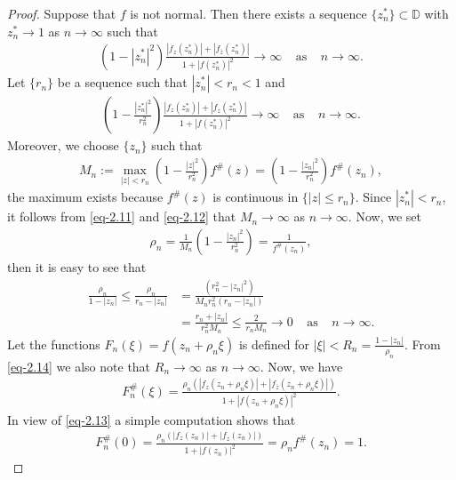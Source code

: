 \documentclass[a4paper,12pt]{amsart}
\theoremstyle{plain}
\theoremstyle{definition}
\begin{document}
\begin{proof}
Suppose that $f$ is not normal. Then there exists a sequence $\{z^*_n\}\subset\mathbb{D}$ with $z^*_n\rightarrow 1$ as $n\rightarrow\infty$ such that 
\begin{align*}
	\left(1-|z^*_n|^2\right)\frac{|f_z(z^*_n)|+|f_{\overline{z}}(z^*_n)|}{1+|f(z^*_n)|^2}\rightarrow\infty \;\;\;\; \mbox{as}\;\;\;\;n\rightarrow\infty.
\end{align*}
Let $\{r_n\}$ be a sequence such that $|z^*_n|<r_n<1$ and
\begin{align}\label{eq-2.11}
	\left(1-\frac{|z^*_n|^2}{r^2_n}\right)\frac{|f_z(z^*_n)|+|f_{\overline{z}}(z^*_n)|}{1+|f(z^*_n)|^2}\rightarrow\infty \;\;\;\; \mbox{as}\;\;\;\;n\rightarrow\infty.
\end{align}
Moreover, we choose $\{z_n\}$ such that
\begin{align}\label{eq-2.12}
	M_n:=\max_{|z|<r_n}\left(1-\frac{|z|^2}{r^2_n}\right)f^{\#}(z) =\left(1-\frac{|z_n|^2}{r^2_n}\right)f^{\#}(z_n),
\end{align}
the maximum exists because $f^{\#}(z)$ is continuous in $\{|z|\leq r_n\}$. Since $|z^*_n|< r_n$, it follows from \eqref{eq-2.11} and \eqref{eq-2.12} that $M_n\rightarrow\infty$ as $n\rightarrow\infty$. Now, we set 
\begin{align}\label{eq-2.13}
	\rho_n=\frac{1}{M_n} \left(1-\frac{|z_n|^2}{r^2_n}\right) =\frac{1}{f^{\#}(z_n)},
\end{align}
then it is easy to see that
\begin{align}\label{eq-2.14}
	\frac{\rho_n}{1-|z_n|}\leq \frac{\rho_n}{r_n-|z_n|}&= \frac{(r^2_n -|z_n|^2)}{M_n r^2_n (r_n -|z_n|)}\\&\nonumber=\frac{r_n +|z_n|}{r^2_n M_n}\leq \frac{2}{r_n M_n}\rightarrow 0 \;\;\;\;\mbox{as}\;\;\;\; n\rightarrow\infty.
\end{align}
Let the functions $F_n(\xi)=f(z_n+\rho_n\xi)$ is defined for $|\xi|<R_n=\frac{1-|z_n|}{\rho_n}$. From \eqref{eq-2.14} we also note that $R_n\rightarrow\infty$ as $n\rightarrow\infty$. Now, we have
\begin{align*}
	F^{\#}_n(\xi)= \frac{\rho_n\left(|f_z(z_n+\rho_n\xi)| + |f_{\overline{z}}(z_n+\rho_n\xi)|\right)}{1+ |f(z_n+\rho_n\xi)|^2}.
\end{align*}
In view of \eqref{eq-2.13} a simple computation shows that
\begin{align}\label{eq-2.15}
	F^{\#}_n(0)= \frac{\rho_n\left(|f_z(z_n)| + |f_{\overline{z}} (z_n)|\right)}{1+ |f(z_n)|^2}=\rho_n f^{\#}(z_n)=1.
\end{align}

\end{proof}
\end{document}
